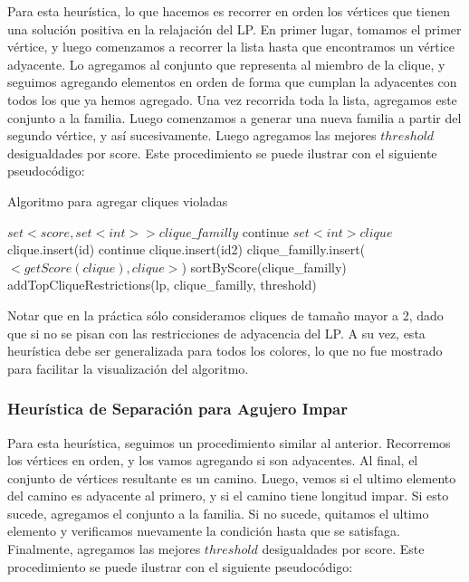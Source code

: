 Para esta heurística, lo que hacemos es recorrer en orden los vértices que tienen una solución positiva en la relajación del LP. En primer lugar, tomamos el primer vértice, y luego comenzamos a recorrer la lista hasta que encontramos un vértice adyacente. Lo agregamos al conjunto que representa al miembro de la clique, y seguimos agregando elementos en orden de forma que cumplan la adyacentes con todos los que ya hemos agregado. Una vez recorrida toda la lista, agregamos este conjunto a la familia. Luego comenzamos a generar una nueva familia a partir del segundo vértice, y así sucesivamente. Luego agregamos las mejores $threshold$ desigualdades por score. Este procedimiento se puede ilustrar con el siguiente pseudocódigo:

\begin{algorithm}
\caption{Algoritmo para agregar cliques violadas}
\begin{algorithmic}[1]
\State $set<score, set<int>> clique\_familly$
		\State continue
	\EndIf
	\State $set<int> clique$
	\State clique.insert(id)
			\State continue
		\EndIf
			\State clique.insert(id2)
		\EndIf
	\EndFor
		\State clique\_familly.insert($<getScore(clique), clique>$)
	\EndIf
\EndFor
\State sortByScore(clique\_familly)
\State addTopCliqueRestrictions(lp, clique\_familly, threshold)
\EndProcedure
\end{algorithmic}
\end{algorithm}

Notar que en la práctica sólo consideramos cliques de tamaño mayor a 2, dado que si no se pisan con las restricciones de adyacencia del LP. A su vez, esta heurística debe ser generalizada para todos los colores, lo que no fue mostrado para facilitar la visualización del algoritmo.

\pagebreak

\subsubsection{Heurística de Separación para Agujero Impar}

Para esta heurística, seguimos un procedimiento similar al anterior. Recorremos los vértices en orden, y los vamos agregando si son adyacentes. Al final, el conjunto de vértices resultante es un camino. Luego, vemos si el ultimo elemento del camino es adyacente al primero, y si el camino tiene longitud impar. Si esto sucede, agregamos el conjunto a la familia. Si no sucede, quitamos el ultimo elemento y verificamos nuevamente la condición hasta que se satisfaga. Finalmente, agregamos las mejores $threshold$ desigualdades por score. Este procedimiento se puede ilustrar con el siguiente pseudocódigo:

